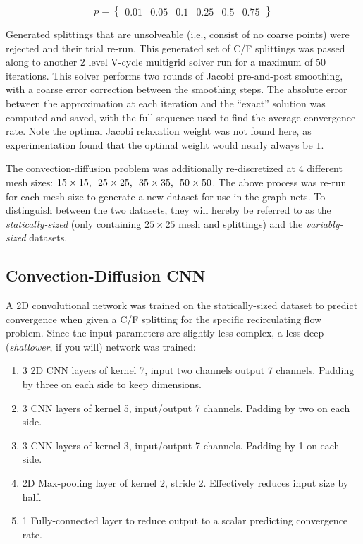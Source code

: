 \documentclass[review]{siamart190516}
\begin{document}
\begin{equation} \label{eqn:conv_probabilities}
  p = \begin{Bmatrix} 0.01 & 0.05 & 0.1 & 0.25 & 0.5 & 0.75 \end{Bmatrix}
\end{equation}

Generated splittings that are unsolveable (i.e., consist of no coarse points) were rejected and their trial re-run.  This generated set of C/F splittings was passed along to another 2 level V-cycle multigrid solver run for a maximum of 50 iterations.  This solver performs two rounds of Jacobi pre-and-post smoothing, with a coarse error correction between the smoothing steps.  The absolute error between the approximation at each iteration and the ``exact'' solution was computed and saved, with the full sequence used to find the average convergence rate.  Note the optimal Jacobi relaxation weight was not found here, as experimentation found that the optimal weight would nearly always be $1$.

The convection-diffusion problem was additionally re-discretized at 4 different mesh sizes: $15\times 15,\enskip 25\times 25,\enskip 35\times 35,\enskip 50\times 50$.  The above process was re-run for each mesh size to generate a new dataset for use in the graph nets.  To distinguish between the two datasets, they will hereby be referred to as the \textit{statically-sized} (only containing $25 \times 25$ mesh and splittings) and the \textit{variably-sized} datasets.

\subsection{Convection-Diffusion CNN}\label{subsec:conv_cnn}

A 2D convolutional network was trained on the statically-sized dataset to predict convergence when given a C/F splitting for the specific recirculating flow problem.  Since the input parameters are slightly less complex, a less deep (\textit{shallower}, if you will) network was trained:

\begin{enumerate}
\item 3 2D CNN layers of kernel 7, input two channels output 7 channels.  Padding by three on each side to keep dimensions.
\item 3 CNN layers of kernel 5, input/output 7 channels.  Padding by two on each side.
\item 3 CNN layers of kernel 3, input/output 7 channels.  Padding by 1 on each side.
\item 2D Max-pooling layer of kernel 2, stride 2.  Effectively reduces input size by half.
\item 1 Fully-connected layer to reduce output to a scalar predicting convergence rate.
\end{enumerate}
\end{document}
